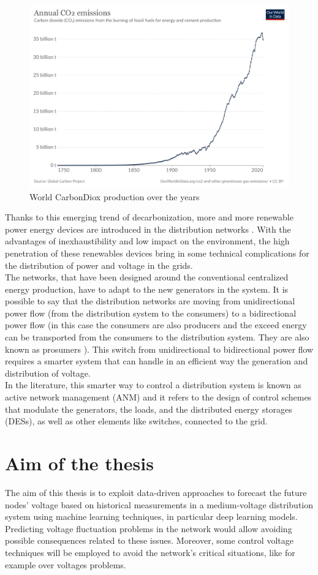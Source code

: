 \begin{figure}[H]
\centering
    \includegraphics[width=.6\linewidth]{images/Introduction/annual-co2-emissions-per-country.pdf}
\caption[\gls{CarbonDiox} production over the years]{World \gls{CarbonDiox} production over the years \cite{C02prod}}
\end{figure}

Thanks to this emerging trend of decarbonization, more and more renewable power energy devices are introduced in the distribution networks \cite{owidenergy}. With the advantages of inexhaustibility and low impact on the environment, the high penetration of these renewables devices bring in some technical complications for the distribution of power and voltage in the grids. \\
The networks, that have been designed around the conventional centralized energy production, have to adapt to the new generators in the system. It is possible to say that the distribution networks are moving from unidirectional power flow (from the distribution system to the consumers) to a bidirectional power flow (in this case the consumers are also producers and the exceed energy can be transported from the consumers to the distribution system. They are also known as prosumers \cite{prosumers}). This switch from unidirectional to bidirectional power flow requires a smarter system that can handle in an efficient way the generation and distribution of voltage.\\

In the literature, this smarter way to control a distribution system is known as active network management (\gls{ANM}) and it refers to the design of control schemes that modulate the generators, the loads, and the distributed energy storages (\glspl{DES}), as well as other elements like switches, connected to the grid. \\


\section{Aim of the thesis}
\label{sec:aimthesis}
The aim of this thesis is to exploit data-driven approaches to forecast the future nodes' voltage based on historical measurements in a medium-voltage distribution system using machine learning techniques, in particular deep learning models. Predicting voltage fluctuation problems in the network would allow avoiding possible consequences related to these issues. Moreover, some control voltage techniques will be employed to avoid the network's critical situations, like for example over voltages problems.

